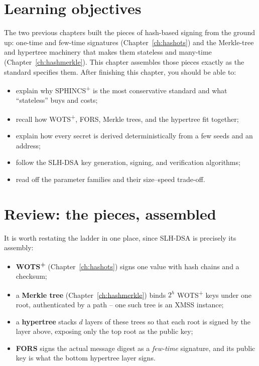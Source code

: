 \section{Learning objectives}

The two previous chapters built the pieces of hash-based signing from the ground up: one-time and few-time signatures (Chapter~\ref{ch:hashots}) and the Merkle-tree and hypertree machinery that makes them stateless and many-time (Chapter~\ref{ch:hashmerkle}). This chapter assembles those pieces exactly as the standard specifies them. After finishing this chapter, you should be able to:

\begin{itemize}
  \item explain why SPHINCS\textsuperscript{+} is the most conservative standard and what ``stateless'' buys and costs;
  \item recall how WOTS\textsuperscript{+}, FORS, Merkle trees, and the hypertree fit together;
  \item explain how every secret is derived deterministically from a few seeds and an address;
  \item follow the SLH-DSA key generation, signing, and verification algorithms;
  \item read off the parameter families and their size--speed trade-off.
\end{itemize}

\section{Review: the pieces, assembled}
It is worth restating the ladder in one place, since SLH-DSA is precisely its assembly:

\begin{itemize}
  \item \textbf{WOTS\textsuperscript{+}} (Chapter~\ref{ch:hashots}) signs one value with hash chains and a checksum;
  \item a \textbf{Merkle tree} (Chapter~\ref{ch:hashmerkle}) binds $2^h$ WOTS\textsuperscript{+} keys under one root, authenticated by a path -- one such tree is an XMSS instance;
  \item a \textbf{hypertree} stacks $d$ layers of these trees so that each root is signed by the layer above, exposing only the top root as the public key;
  \item \textbf{FORS} signs the actual message digest as a \emph{few-time} signature, and its public key is what the bottom hypertree layer signs.
\end{itemize}

